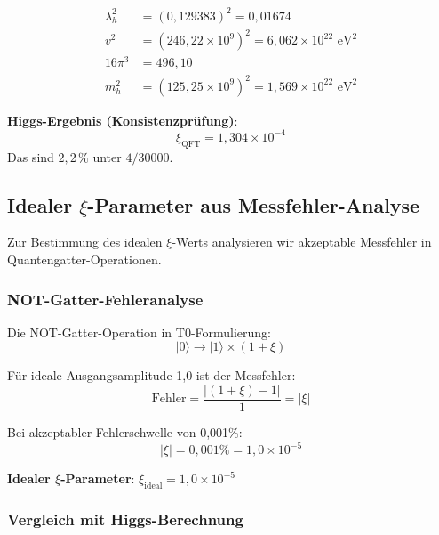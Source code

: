 	\begin{align}
		\lambda_h^2 &= (0,129383)^2 = 0,01674 \\
		v^2 &= (246,22 \times 10^9)^2 = 6,062 \times 10^{22} \text{ eV}^2 \\
		16\pi^3 &= 496{,}10 \\
		m_h^2 &= (125,25 \times 10^9)^2 = 1,569 \times 10^{22} \text{ eV}^2
	\end{align}
	
	\textbf{Higgs-Ergebnis (Konsistenzprüfung)}:
	\begin{equation}
		\xi_{\text{QFT}} = 1{,}304 \times 10^{-4}
	\end{equation}
	Das sind $2{,}2\,\%$ unter $4/30000$.
	
	\subsection{Idealer $\xi$-Parameter aus Messfehler-Analyse}
	
	Zur Bestimmung des idealen $\xi$-Werts analysieren wir akzeptable Messfehler in Quantengatter-Operationen.
	
	\subsubsection{NOT-Gatter-Fehleranalyse}
	
	Die NOT-Gatter-Operation in T0-Formulierung:
	\begin{equation}
		|0\rangle \rightarrow |1\rangle \times (1 + \xi)
	\end{equation}
	
	Für ideale Ausgangsamplitude 1,0 ist der Messfehler:
	\begin{equation}
		\text{Fehler} = \frac{|(1 + \xi) - 1|}{1} = |\xi|
	\end{equation}
	
	Bei akzeptabler Fehlerschwelle von 0,001\%:
	\begin{equation}
		|\xi| = 0,001\% = 1,0 \times 10^{-5}
	\end{equation}
	
	\textbf{Idealer $\xi$-Parameter}: $\xi_{\text{ideal}} = 1,0 \times 10^{-5}$
	
	\subsubsection{Vergleich mit Higgs-Berechnung}
	
